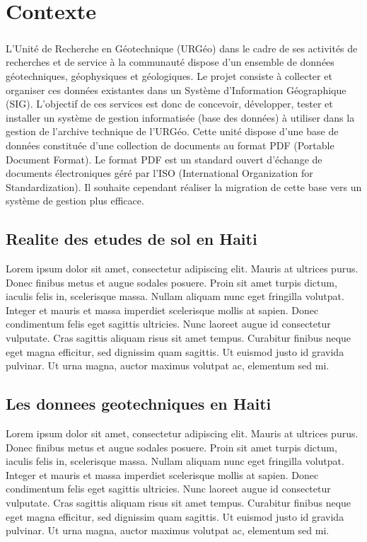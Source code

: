 \chapter*{Contexte}
\paragraph{}
L’Unité de Recherche en Géotechnique (URGéo) dans le cadre de ses activités de recherches et de service à
la communauté dispose d’un ensemble de données géotechniques, géophysiques et géologiques. Le projet
consiste à collecter et organiser ces données existantes dans un Système d’Information Géographique (SIG).
L’objectif de ces services est donc de concevoir, développer, tester et installer un système de gestion
informatisée (base des données) à utiliser dans la gestion de l’archive technique de l’URGéo. Cette unité
dispose d'une base de données constituée d’une collection de documents au format PDF (Portable Document
Format). Le format PDF est un standard ouvert d'échange de documents électroniques géré par l’ISO
(International Organization for Standardization). Il souhaite cependant réaliser la migration de cette base vers
un système de gestion plus efficace.
    \section{Realite des etudes de sol en Haiti}
    Lorem ipsum dolor sit amet, consectetur adipiscing elit. Mauris at ultrices purus. Donec finibus metus et augue sodales posuere. Proin sit amet turpis dictum, iaculis felis in, scelerisque massa. Nullam aliquam nunc eget fringilla volutpat. Integer et mauris et massa imperdiet scelerisque mollis at sapien. Donec condimentum felis eget sagittis ultricies. Nunc laoreet augue id consectetur vulputate. Cras sagittis aliquam risus sit amet tempus. Curabitur finibus neque eget magna efficitur, sed dignissim quam sagittis. Ut euismod justo id gravida pulvinar. Ut urna magna, auctor maximus volutpat ac, elementum sed mi.
    \section{Les donnees geotechniques en Haiti}
    Lorem ipsum dolor sit amet, consectetur adipiscing elit. Mauris at ultrices purus. Donec finibus metus et augue sodales posuere. Proin sit amet turpis dictum, iaculis felis in, scelerisque massa. Nullam aliquam nunc eget fringilla volutpat. Integer et mauris et massa imperdiet scelerisque mollis at sapien. Donec condimentum felis eget sagittis ultricies. Nunc laoreet augue id consectetur vulputate. Cras sagittis aliquam risus sit amet tempus. Curabitur finibus neque eget magna efficitur, sed dignissim quam sagittis. Ut euismod justo id gravida pulvinar. Ut urna magna, auctor maximus volutpat ac, elementum sed mi.
